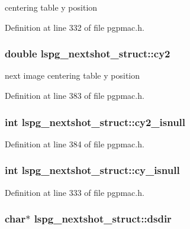 centering table y position 



Definition at line 332 of file pgpmac.\-h.

\hypertarget{structlspg__nextshot__struct_a3644e5c3f12af18a3b426d4d4d7e16a5}{
\subsubsection[{cy2}]{\setlength{\rightskip}{0pt plus 5cm}double lspg\-\_\-nextshot\-\_\-struct\-::cy2}}\label{structlspg__nextshot__struct_a3644e5c3f12af18a3b426d4d4d7e16a5}


next image centering table y position 



Definition at line 383 of file pgpmac.\-h.

\hypertarget{structlspg__nextshot__struct_a57d78a389413827302df6ebe3dcb3c89}{
\subsubsection[{cy2\-\_\-isnull}]{\setlength{\rightskip}{0pt plus 5cm}int lspg\-\_\-nextshot\-\_\-struct\-::cy2\-\_\-isnull}}\label{structlspg__nextshot__struct_a57d78a389413827302df6ebe3dcb3c89}


Definition at line 384 of file pgpmac.\-h.

\hypertarget{structlspg__nextshot__struct_a3895d645420848aed05b95694ec8c6c7}{
\subsubsection[{cy\-\_\-isnull}]{\setlength{\rightskip}{0pt plus 5cm}int lspg\-\_\-nextshot\-\_\-struct\-::cy\-\_\-isnull}}\label{structlspg__nextshot__struct_a3895d645420848aed05b95694ec8c6c7}


Definition at line 333 of file pgpmac.\-h.

\hypertarget{structlspg__nextshot__struct_ac372e1774a25b3d4bfbb9169762eb39e}{
\subsubsection[{dsdir}]{\setlength{\rightskip}{0pt plus 5cm}char$\ast$ lspg\-\_\-nextshot\-\_\-struct\-::dsdir}}\label{structlspg__nextshot__struct_ac372e1774a25b3d4bfbb9169762eb39e}


